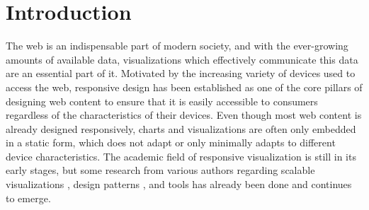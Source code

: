 \chapter{Introduction}
\label{chap:Introduction}

The web is an indispensable part of modern society, and with the
ever-growing amounts of available data, visualizations which
effectively communicate this data are an essential part of it.
Motivated by the increasing variety of devices used to access the web,
responsive design has been established as one of the core pillars of
designing web content to ensure that it is easily accessible to consumers
regardless of the characteristics of their devices. Even though most
web content is already designed responsively, charts and
visualizations are often only embedded in a static form, which does
not adapt or only minimally adapts to different device
characteristics. The academic field of responsive visualization is
still in its early stages, but some research from various authors
regarding scalable visualizations
\parencite{BuildingRespDataVisForTheWeb,LearningRespDataVis}, design
patterns
\parencite{RespVisTalk,RespVisPage,RespVis,TechniquesForFlexibleRespVisDesign,
  DesignPatternsTradeOffsRespVis}, and tools
\parencite{TechniquesForFlexibleRespVisDesign} has already been done
and continues to emerge.



